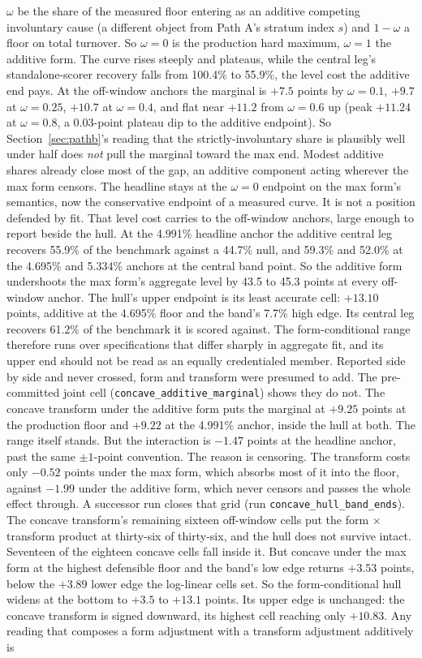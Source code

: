 \documentclass[12pt]{article}
\begin{document}
$\omega$ be the share of the measured floor entering as an additive competing involuntary cause (a different object from Path A's stratum index $s$) and $1-\omega$ a floor on total turnover. So $\omega = 0$ is the production hard maximum, $\omega = 1$ the additive form. The curve rises steeply and plateaus, while the central leg's standalone-scorer recovery falls from 100.4\% to 55.9\%, the level cost the additive end pays. At the off-window anchors the marginal is $+7.5$ points by $\omega = 0.1$, $+9.7$ at $\omega = 0.25$, $+10.7$ at $\omega = 0.4$, and flat near $+11.2$ from $\omega = 0.6$ up (peak $+11.24$ at $\omega = 0.8$, a 0.03-point plateau dip to the additive endpoint). So Section~\ref{sec:pathb}'s reading that the strictly-involuntary share is plausibly well under half does \emph{not} pull the marginal toward the max end. Modest additive shares already close most of the gap, an additive component acting wherever the max form censors. The headline stays at the $\omega = 0$ endpoint on the max form's semantics, now the conservative endpoint of a measured curve. It is not a position defended by fit. That level cost carries to the off-window anchors, large enough to report beside the hull. At the 4.991\% headline anchor the additive central leg recovers 55.9\% of the benchmark against a 44.7\% null, and 59.3\% and 52.0\% at the 4.695\% and 5.334\% anchors at the central band point. So the additive form undershoots the max form's aggregate level by 43.5 to 45.3 points at every off-window anchor. The hull's upper endpoint is its least accurate cell: $+13.10$ points, additive at the 4.695\% floor and the band's 7.7\% high edge. Its central leg recovers 61.2\% of the benchmark it is scored against. The form-conditional range therefore runs over specifications that differ sharply in aggregate fit, and its upper end should not be read as an equally credentialed member. Reported side by side and never crossed, form and transform were presumed to add. The pre-committed joint cell (\texttt{concave\_additive\_marginal}) shows they do not. The concave transform under the additive form puts the marginal at $+9.25$ points at the production floor and $+9.22$ at the 4.991\% anchor, inside the hull at both. The range itself stands. But the interaction is $-1.47$ points at the headline anchor, past the same $\pm 1$-point convention. The reason is censoring. The transform costs only $-0.52$ points under the max form, which absorbs most of it into the floor, against $-1.99$ under the additive form, which never censors and passes the whole effect through. A successor run closes that grid (run \texttt{concave\_hull\_band\_ends}). The concave transform's remaining sixteen off-window cells put the form $\times$ transform product at thirty-six of thirty-six, and the hull does not survive intact. Seventeen of the eighteen concave cells fall inside it. But concave under the max form at the highest defensible floor and the band's low edge returns $+3.53$ points, below the $+3.89$ lower edge the log-linear cells set. So the form-conditional hull widens at the bottom to $+3.5$ to $+13.1$ points. Its upper edge is unchanged: the concave transform is signed downward, its highest cell reaching only $+10.83$. Any reading that composes a form adjustment with a transform adjustment additively is 
\end{document}
